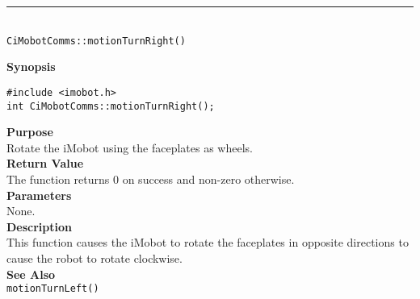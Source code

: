 \noindent
\vspace{5pt}
\rule{4.5in}{0.015in}\\
\noindent
{\LARGE \texttt{CiMobotComms::motionTurnRight()}}\\
{}

\noindent
{\bf Synopsis}\\
\begin{verbatim}
#include <imobot.h>
int CiMobotComms::motionTurnRight();
\end{verbatim}

\noindent
{\bf Purpose}\\
Rotate the iMobot using the faceplates as wheels.\\

\noindent
{\bf Return Value}\\
The function returns 0 on success and non-zero otherwise.\\

\noindent
{\bf Parameters}\\
None.\\

\noindent
{\bf Description}\\
This function causes the iMobot to rotate the faceplates in opposite directions
to cause the robot to rotate clockwise.\\

\noindent
{\bf See Also}\\
\texttt{motionTurnLeft()}

